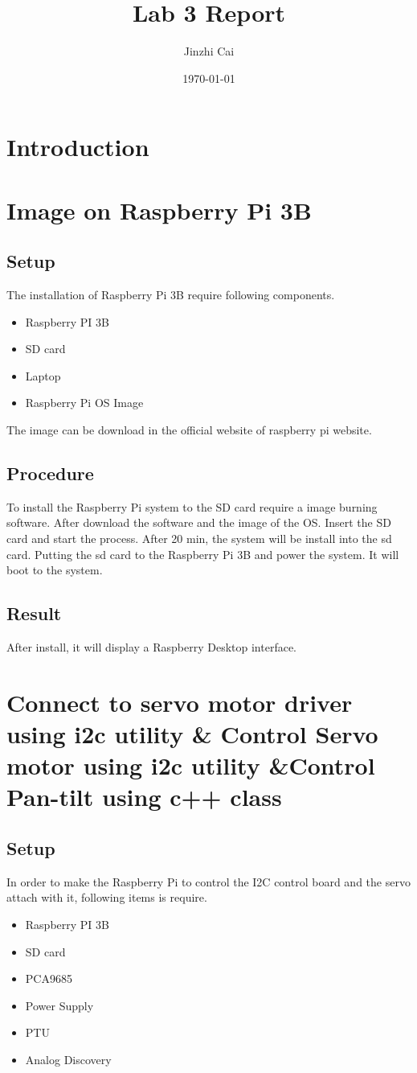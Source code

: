\documentclass{article}
\title{Lab 3 Report}
\author{Jinzhi Cai}
\date{\today}
\begin{document}
\maketitle
\newpage
\tableofcontents
\clearpage
\section{Introduction}
\clearpage



\section{Image on Raspberry Pi 3B}
\subsection{Setup}
The installation of Raspberry Pi 3B require following components.
\begin{itemize}
	\item Raspberry PI 3B
	\item SD card
	\item Laptop
	\item Raspberry Pi OS Image
\end{itemize}
The image can be download in the official website of raspberry pi website.
\subsection{Procedure}
To install the Raspberry Pi system to the SD card require a image burning software. After download the software and the image of the OS. Insert the SD card and start the process. After 20 min, the system will be install into the sd card. Putting the sd card to the Raspberry Pi 3B and power the system. It will boot to the system.
\subsection{Result}
After install, it will display a Raspberry Desktop interface.
\clearpage





\section{Connect to servo motor driver using i2c utility \& Control Servo motor using i2c utility \&Control Pan-tilt using c++ class}
\subsection{Setup}
In order to make the Raspberry Pi to control the I2C control board and the servo attach with it, following items is require.
\begin{itemize}
	\item Raspberry PI 3B
	\item SD card
	\item PCA9685
	\item Power Supply
	\item PTU
	\item Analog Discovery
\end{itemize}
\end{document}
